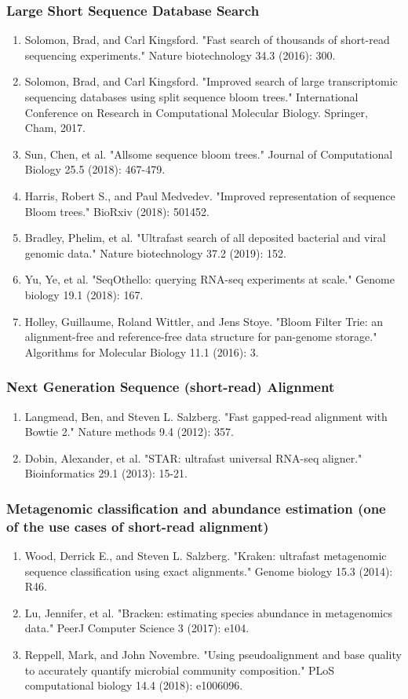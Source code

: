 \subsubsection{Large Short Sequence Database Search}
\begin{enumerate}
    \item Solomon, Brad, and Carl Kingsford. "Fast search of thousands of short-read sequencing experiments." Nature biotechnology 34.3 (2016): 300.
    \item Solomon, Brad, and Carl Kingsford. "Improved search of large transcriptomic sequencing databases using split sequence bloom trees." International Conference on Research in Computational Molecular Biology. Springer, Cham, 2017.
    \item Sun, Chen, et al. "Allsome sequence bloom trees." Journal of Computational Biology 25.5 (2018): 467-479.
    \item Harris, Robert S., and Paul Medvedev. "Improved representation of sequence Bloom trees." BioRxiv (2018): 501452.
    \item Bradley, Phelim, et al. "Ultrafast search of all deposited bacterial and viral genomic data." Nature biotechnology 37.2 (2019): 152.
    \item Yu, Ye, et al. "SeqOthello: querying RNA-seq experiments at scale." Genome biology 19.1 (2018): 167.
    \item Holley, Guillaume, Roland Wittler, and Jens Stoye. "Bloom Filter Trie: an alignment-free and reference-free data structure for pan-genome storage." Algorithms for Molecular Biology 11.1 (2016): 3.
\end{enumerate}
\subsubsection{Next Generation Sequence (short-read) Alignment}
\begin{enumerate}
    \item Langmead, Ben, and Steven L. Salzberg. "Fast gapped-read alignment with Bowtie 2." Nature methods 9.4 (2012): 357.
    \item Dobin, Alexander, et al. "STAR: ultrafast universal RNA-seq aligner." Bioinformatics 29.1 (2013): 15-21.
\end{enumerate}
\subsubsection{Metagenomic classification and abundance estimation (one of the use cases of short-read alignment)}
\begin{enumerate}
    \item Wood, Derrick E., and Steven L. Salzberg. "Kraken: ultrafast metagenomic sequence classification using exact alignments." Genome biology 15.3 (2014): R46.
    \item Lu, Jennifer, et al. "Bracken: estimating species abundance in metagenomics data." PeerJ Computer Science 3 (2017): e104.
    \item Reppell, Mark, and John Novembre. "Using pseudoalignment and base quality to accurately quantify microbial community composition." PLoS computational biology 14.4 (2018): e1006096.
\end{enumerate}
